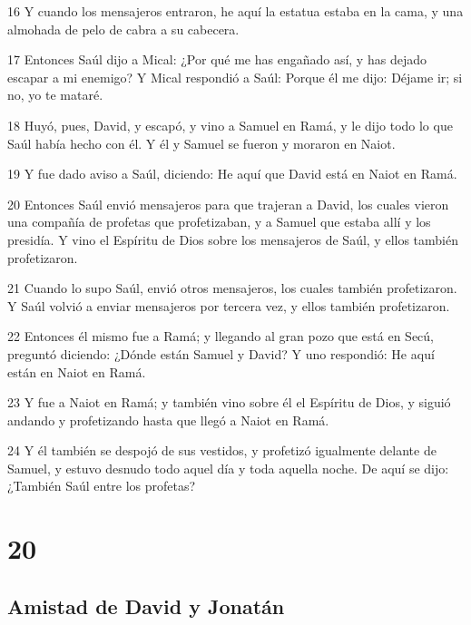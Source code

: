 \par 16 Y cuando los mensajeros entraron, he aquí la estatua estaba en la cama, y una almohada de pelo de cabra a su cabecera.
\par 17 Entonces Saúl dijo a Mical: ¿Por qué me has engañado así, y has dejado escapar a mi enemigo? Y Mical respondió a Saúl: Porque él me dijo: Déjame ir; si no, yo te mataré.
\par 18 Huyó, pues, David, y escapó, y vino a Samuel en Ramá, y le dijo todo lo que Saúl había hecho con él. Y él y Samuel se fueron y moraron en Naiot.
\par 19 Y fue dado aviso a Saúl, diciendo: He aquí que David está en Naiot en Ramá.
\par 20 Entonces Saúl envió mensajeros para que trajeran a David, los cuales vieron una compañía de profetas que profetizaban, y a Samuel que estaba allí y los presidía. Y vino el Espíritu de Dios sobre los mensajeros de Saúl, y ellos también profetizaron.
\par 21 Cuando lo supo Saúl, envió otros mensajeros, los cuales también profetizaron. Y Saúl volvió a enviar mensajeros por tercera vez, y ellos también profetizaron.
\par 22 Entonces él mismo fue a Ramá; y llegando al gran pozo que está en Secú, preguntó diciendo: ¿Dónde están Samuel y David? Y uno respondió: He aquí están en Naiot en Ramá.
\par 23 Y fue a Naiot en Ramá; y también vino sobre él el Espíritu de Dios, y siguió andando y profetizando hasta que llegó a Naiot en Ramá.
\par 24 Y él también se despojó de sus vestidos, y profetizó igualmente delante de Samuel, y estuvo desnudo todo aquel día y toda aquella noche. De aquí se dijo: ¿También Saúl entre los profetas? 

\chapter{20}

\section*{Amistad de David y Jonatán}

